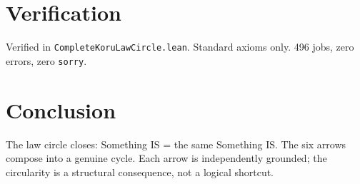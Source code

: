 \documentclass[12pt,a4paper]{article}
\begin{document}
\section{Verification}

Verified in \texttt{CompleteKoruLawCircle.lean}. Standard axioms only.
496 jobs, zero errors, zero \texttt{sorry}.

\section{Conclusion}

The law circle closes: Something IS = the same Something IS. The six
arrows compose into a genuine cycle. Each arrow is independently
grounded; the circularity is a structural consequence, not a logical
shortcut.
\end{document}
